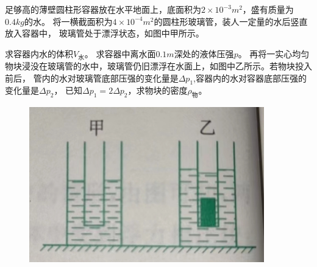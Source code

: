 \documentclass[a4paper,cs4size]{BHCexam}
\begin{document}
\begin{groups}
\begin{questions}[]
        \question[5] 足够高的薄壁圆柱形容器放在水平地面上，底面积为$2\times 10^{-3}m^2$，盛有质量为$0.4kg$的水。
        将一横截面积为$4\times 10^{-4}m^2$的圆柱形玻璃管，装人一定量的水后竖直放入容器中，
        玻璃管处于漂浮状态，如图中甲所示。
        \begin{subquestions}
            \subquestion 求容器内水的体积$V_{\text{水}}$。
            \subquestion 求容器中离水面$0.1m$深处的液体压强$p$。
            \subquestion 再将一实心均匀物块浸没在玻璃管的水中，玻璃管仍旧漂浮在水面上，如图中乙所示。若物块投入前后，
            管内的水对玻璃管底部压强的变化量是$\Delta p_1$,容器内的水对容器底部压强的变化量是$\Delta p_2$，
            已知$\Delta p_1=2\Delta p_2$，求物块的密度$\rho_{\text{物}}$。
        \end{subquestions}
        \begin{figure}[htb]
            \flushright
            \includegraphics [scale=0.5,trim=0 0 0 0]{./image/pyhsics_buoyantforce_8.png}
            \label{fig:fig_buoyantforce_8.png}
        \end{figure}





    \end{questions}
\end{groups}


\label{lastpage}
\end{document}
